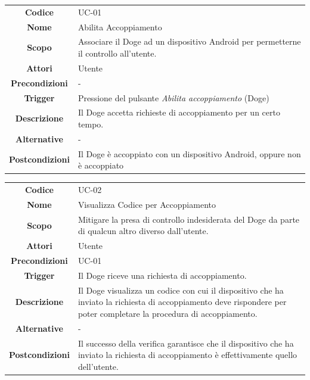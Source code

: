 \documentclass{article}
\begin{document}
    \pagebreak
    
    \begin{adjustbox}{center}
    \begin{tabular}{|c|p{10cm}|}
    \hline
    \textbf{Codice} & UC-01 \\
    \textbf{Nome} & Abilita Accoppiamento \\
    \textbf{Scopo} & Associare il Doge ad un dispositivo Android per permetterne il controllo all'utente. \\
    \textbf{Attori} & Utente \\
    \textbf{Precondizioni} & - \\
    \textbf{Trigger} & Pressione del pulsante \emph{Abilita accoppiamento} (Doge) \\
    \textbf{Descrizione} & Il Doge accetta richieste di accoppiamento per un certo tempo. \\
    \textbf{Alternative} & - \\
    \textbf{Postcondizioni} & Il Doge è accoppiato con un dispositivo Android, oppure non è accoppiato \\
    \hline
    \end{tabular}
    \end{adjustbox}
    
    \begin{adjustbox}{center}
    \begin{tabular}{|c|p{10cm}|}
    \hline
    \textbf{Codice} & UC-02 \\
    \textbf{Nome} & Visualizza Codice per Accoppiamento \\
    \textbf{Scopo} & Mitigare la presa di controllo indesiderata del Doge da parte di qualcun altro diverso dall'utente. \\
    \textbf{Attori} & Utente \\
    \textbf{Precondizioni} & UC-01 \\
    \textbf{Trigger} & Il Doge riceve una richiesta di accoppiamento. \\
    \textbf{Descrizione} & Il Doge visualizza un codice con cui il dispositivo che ha inviato la richiesta di accoppiamento deve rispondere per poter completare la
    procedura di accoppiamento. \\
    \textbf{Alternative} & - \\
    \textbf{Postcondizioni} & Il successo della verifica garantisce che il dispositivo che ha inviato la richiesta di accoppiamento è effettivamente quello dell'utente. \\
    \hline
    \end{tabular}
    \end{adjustbox}
    
\end{document}
